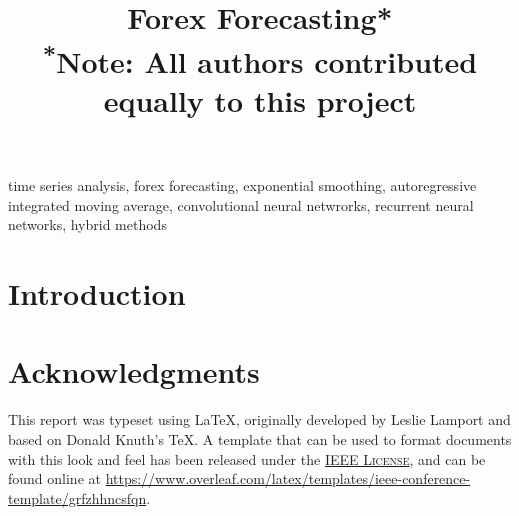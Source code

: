 \documentclass[conference]{IEEEtran}
\begin{document}
    \makeatletter
    \newcommand{\linebreakand}{%
      \end{@IEEEauthorhalign}
      \hfill\mbox{}\par
      \mbox{}\hfill\begin{@IEEEauthorhalign}
    }
    \makeatother

\title{Forex Forecasting*\\
{\footnotesize \textsuperscript{*}Note: All authors contributed equally to this project}
}

\author{
\and
{}
\and
{}
}

\maketitle

\begin{abstract}

\end{abstract}

\begin{IEEEkeywords}
time series analysis, forex forecasting, exponential smoothing, autoregressive integrated moving average, convolutional neural netwrorks, recurrent neural networks, hybrid methods 
\end{IEEEkeywords}

\section{Introduction}


\section*{Acknowledgments}

This report was typeset using \LaTeX, originally developed by Leslie Lamport and based on Donald Knuth's \TeX. A template that can be used to format documents with this look and feel has been released under the \href{https://www.ieee.org/publications/subscriptions/info/licensing.html}{\textsc{IEEE License}}, and can be found online at \url{https://www.overleaf.com/latex/templates/ieee-conference-template/grfzhhncsfqn}.
\end{document}
